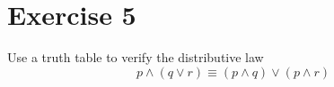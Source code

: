 \documentclass{Axon}
\begin{document}
\section*{Exercise 5}
Use a truth table to verify the distributive law
\begin{equation}
    p \land (q \lor r) \equiv (p \land q) \lor (p \land r)
\end{equation}

\printbibliography
\end{document}
